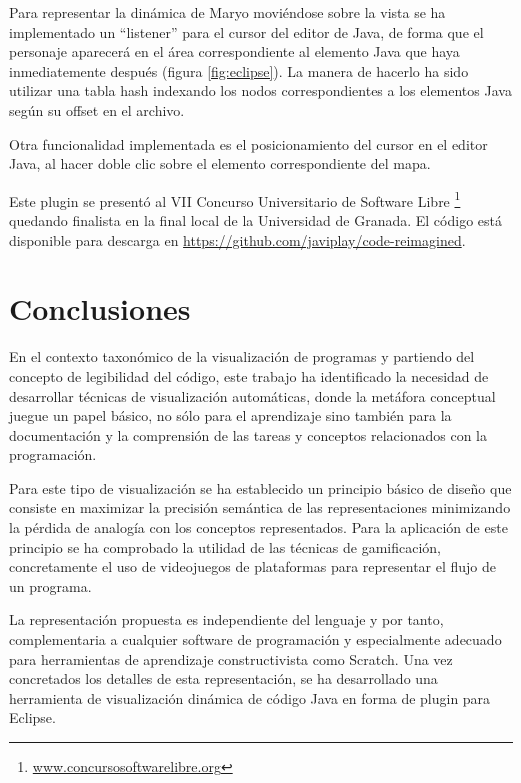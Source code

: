 \documentclass{llncs}
\begin{document}
Para representar la dinámica de Maryo moviéndose sobre la vista se ha implementado un ``listener'' para el cursor del editor de Java, de forma que el personaje aparecerá en el área correspondiente al elemento Java que haya inmediatemente después (figura \ref{fig:eclipse}). La manera de hacerlo ha sido utilizar una tabla hash indexando los nodos correspondientes a los elementos Java según su offset en el archivo.

Otra funcionalidad implementada es el posicionamiento del cursor en el editor Java, al hacer doble clic sobre el elemento correspondiente del mapa.

Este plugin se presentó al VII Concurso Universitario de Software Libre \footnote{\url{www.concursosoftwarelibre.org}} quedando finalista en la final local de la Universidad de Granada. El código está disponible para descarga en \url{https://github.com/javiplay/code-reimagined}.



\section{Conclusiones}
\label{sec:conclusions}

En el contexto taxonómico de la visualización de programas y partiendo del concepto de legibilidad del código, este trabajo ha identificado la necesidad de desarrollar técnicas de visualización automáticas, donde la metáfora conceptual juegue un papel básico, no sólo para el aprendizaje sino también para la documentación y la comprensión de las tareas y conceptos relacionados con la programación. 

Para este tipo de visualización se ha establecido un principio básico de diseño que consiste en maximizar la precisión semántica de las representaciones minimizando la pérdida de analogía con los conceptos representados.
Para la aplicación de este principio se ha comprobado la utilidad de las técnicas de gamificación, concretamente el uso de videojuegos de plataformas para representar el flujo de un programa.

La representación propuesta es independiente del lenguaje y por tanto, complementaria a cualquier software de programación y especialmente adecuado para herramientas de aprendizaje constructivista como Scratch. Una vez concretados los detalles de esta representación, se ha desarrollado una herramienta de visualización dinámica de código Java en forma de plugin para Eclipse. 
\end{document}
